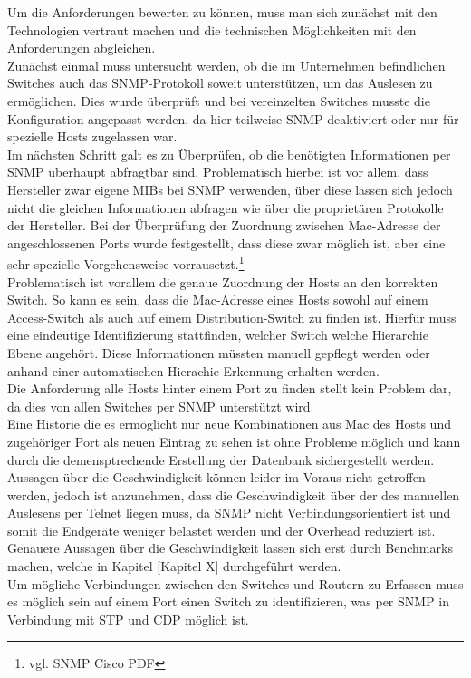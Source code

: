 Um die Anforderungen bewerten zu können, muss man sich zunächst mit den Technologien vertraut machen und die technischen Möglichkeiten mit den Anforderungen abgleichen.\\
Zunächst einmal muss untersucht werden, ob die im Unternehmen befindlichen Switches auch das SNMP-Protokoll soweit unterstützen, um das Auslesen zu ermöglichen.
Dies wurde überprüft und bei vereinzelten Switches musste die Konfiguration angepasst werden, da hier teilweise SNMP deaktiviert oder nur für spezielle Hosts zugelassen war.\\
Im nächsten Schritt galt es zu Überprüfen, ob die benötigten Informationen per SNMP überhaupt abfragtbar sind. Problematisch hierbei ist vor allem, dass Hersteller zwar eigene MIBs bei SNMP verwenden, über diese lassen sich jedoch nicht die gleichen Informationen abfragen wie über die proprietären Protokolle der Hersteller.
Bei der Überprüfung der Zuordnung zwischen Mac-Adresse der angeschlossenen Ports wurde festgestellt, dass diese zwar möglich ist, aber eine sehr spezielle Vorgehensweise vorrausetzt.\footnote{vgl. SNMP Cisco PDF}\\
Problematisch ist vorallem die genaue Zuordnung der Hosts an den korrekten Switch. So kann es sein, dass die Mac-Adresse eines Hosts sowohl auf einem Access-Switch als auch auf einem Distribution-Switch zu finden ist. Hierfür muss eine eindeutige Identifizierung stattfinden, welcher Switch welche Hierarchie Ebene angehört. Diese Informationen müssten manuell gepflegt werden oder anhand einer automatischen Hierachie-Erkennung erhalten werden.\\
Die Anforderung alle Hosts hinter einem Port zu finden stellt kein Problem dar, da dies von allen Switches per SNMP unterstützt wird. \\
Eine Historie die es ermöglicht nur neue Kombinationen aus Mac des Hosts und zugehöriger Port als neuen Eintrag zu sehen ist ohne Probleme möglich und kann durch die demensptrechende Erstellung der Datenbank sichergestellt werden.\\
Aussagen über die Geschwindigkeit können leider im Voraus nicht getroffen werden, jedoch ist anzunehmen, dass die Geschwindigkeit über der des manuellen Auslesens per Telnet liegen muss, da SNMP nicht Verbindungsorientiert ist und somit die Endgeräte weniger belastet werden und der Overhead reduziert ist. Genauere Aussagen über die Geschwindigkeit lassen sich erst durch Benchmarks machen, welche in Kapitel [Kapitel X] durchgeführt werden.\\
Um mögliche Verbindungen zwischen den Switches und Routern zu Erfassen muss es möglich sein auf einem Port einen Switch zu identifizieren, was per SNMP in Verbindung mit STP und CDP möglich ist.\\
